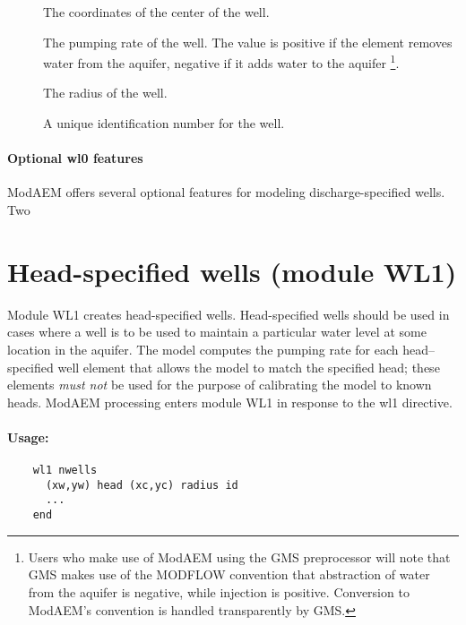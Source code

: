 \begin{description}
\item [] The coordinates of the center of the well. 
\item [] The pumping rate of the well. The value is 
   positive if the element removes water from the aquifer, negative if it adds water 
   to the aquifer \footnote{Users who make use of ModAEM using the GMS preprocessor 
   will note that GMS makes use of the MODFLOW convention that abstraction of water 
   from the aquifer is negative, while injection is positive. Conversion to ModAEM's 
   convention is handled transparently by GMS.}. 
\item [] The radius of the well. 
\item [] A unique identification number for the well. \units{-}
\end{description}

\paragraph{Optional \textsf{wl0} features} ModAEM offers several optional features for modeling discharge-specified wells. Two 


\newpage

\section{Head-specified wells (module WL1)\label{sec:wl1-module}}

Module WL1 creates head-specified wells. Head-specified wells should be used in cases where a well is to be used to maintain a particular water level at some location in the aquifer. The model computes the pumping rate for each head--specified well element that allows the model to match the specified head; these elements \emph{must not} be used for the purpose of calibrating the model to known heads. ModAEM processing enters module WL1 in response to the wl1 directive. 

\paragraph{Usage:}
\begin{verbatim}
    wl1 nwells
      (xw,yw) head (xc,yc) radius id
      ... 
    end
\end{verbatim}

